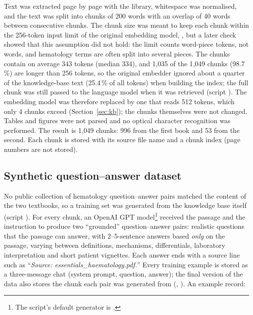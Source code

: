 Text was extracted page by page with the  library, whitespace was normalised, and the text was split into chunks of 200 words with an overlap of 40 words between consecutive chunks. The chunk size was meant to keep each chunk within the 256-token input limit of the original embedding model, , but a later check showed that this assumption did not hold: the limit counts word-piece tokens, not words, and hematology terms are often split into several pieces. The chunks contain on average 343 tokens (median 334), and 1{,}035 of the 1{,}049 chunks (98.7\,\%) are longer than 256 tokens, so the original embedder ignored about a quarter of the knowledge-base text (25.4\,\% of all tokens) when building the index; the full chunk was still passed to the language model when it was retrieved (script ). The embedding model was therefore replaced by one that reads 512 tokens, which only 4 chunks exceed (Section~\ref{sec:kb}); the chunks themselves were not changed. Tables and figures were not parsed and no optical character recognition was performed. The result is 1{,}049 chunks: 996 from the first book and 53 from the second. Each chunk is stored with its source file name and a chunk index (page numbers are not stored).

\subsection{Synthetic question--answer dataset}\label{sec:qa-data}

No public collection of hematology question--answer pairs matched the content of the two textbooks, so a training set was generated from the knowledge base itself (script \allowbreak\mbox{}). For every chunk, an OpenAI GPT model\footnote{The script's default generator is .} received the passage and the instruction to produce two ``grounded'' question--answer pairs: realistic questions that the passage can answer, with 2--5-sentence answers based \emph{only} on the passage, varying between definitions, mechanisms, differentials, laboratory interpretation and short patient vignettes. Each answer ends with a source line such as ``\textit{Source: essentials\_haematology.pdf.}'' Every training example is stored as a three-message chat (system prompt, question, answer); the final version of the data also stores the chunk each pair was generated from (, ). An example record:

